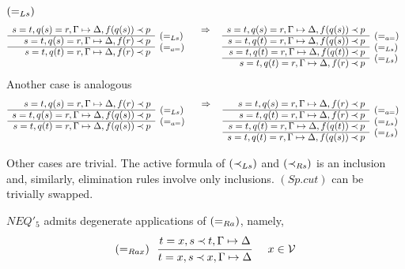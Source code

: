 \begin{PROOF}
\begin{LS}
\item $(=_{Ls})$ %
\[\prar{
s=t, q(s)=r, \GSD,  f(q(s))\Incl p \cl
 s=t, q(s)=r, \GSD, f(r)\Incl p  & \rabove{\eLs} \cl
 s=t, q(t)=r, \GSD, f(r)\Incl p  & \rabove{\eae} 
}\conv
\prar{
 s=t, q(s)=r, \GSD, f(q(s))\Incl p \cl
 s=t, q(t)=r, \GSD, f(q(s))\Incl p & \rabove{\eae} \cl
 s=t, q(t)=r, \GSD, f(q(t))\Incl p & \rabove{\eLs} \cl
 s=t, q(t)=r, \GSD, f(r)\Incl p & \rabove{\eLs} 
}
\]
Another case is analogous
\[\prar{
 s=t, q(s)=r, \GSD, f(r)\Incl p \cl
 s=t, q(s)=r, \GSD, f(q(s))\Incl p & \rabove{\eLs} \cl
 s=t, q(t)=r, \GSD, f(q(s))\Incl p & \rabove{\eae} 
}\conv
\prar{
 s=t, q(s)=r, \GSD, f(r)\Incl p \cl
 s=t, q(t)=r, \GSD, f(r)\Incl p & \rabove{\eae} \cl
 s=t, q(t)=r, \GSD, f(q(t))\Incl p & \rabove{\eLs} \cl
 s=t, q(t)=r, \GSD, f(q(s))\Incl p & \rabove{\eLs} 
}
\]
\item Other cases are trivial. The active formula of $(\mathbin{\prec}_{Ls})$ and $(\mathbin{\prec}_{Rs})$ is an inclusion
and, similarly, elimination rules involve only inclusions. $(Sp.cut)$ can be trivially
swapped.
\end{LS}
\end{PROOF}
%
\begin{LEMMA}\label{le:eRax}
$NEQ'_5$ admits degenerate applications of $(=_{Ra})$, namely, 
\[
\eRax\ \ \mprule{t=x, s\Incl t,\GSD}{t=x, s\Incl x,\GSD}\ \ \ \ 
 x\in\Vars
\]
\end{LEMMA}
